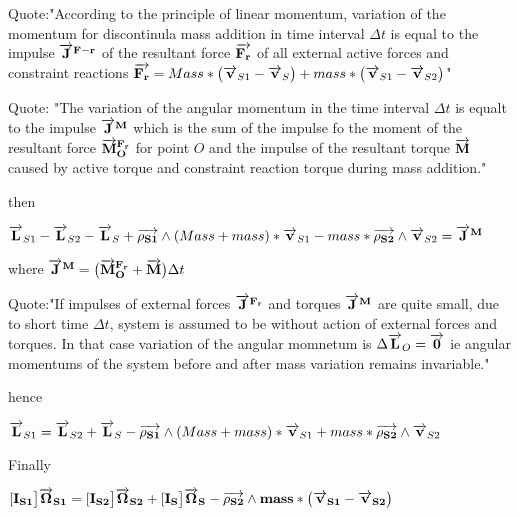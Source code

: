 Quote:"According to the principle of linear momentum, variation of the momentum for discontinula mass addition in time interval $\Delta t$ is equal to the impulse $\overrightarrow{\bf J}^{\bf F-r}$ of the resultant force $\overrightarrow{\bf F_r}$ of all external active forces and constraint reactions $\overrightarrow{\bf F_r}=Mass*\big(\overrightarrow{\bf v}_{S1}-\overrightarrow{\bf v}_{S}\big)+mass*\big(\overrightarrow{\bf v}_{S1}-\overrightarrow{\bf v}_{S2}\big)$"


Quote: "The variation of the angular momentum in the time interval $\Delta t$ is equalt to the impulse $\overrightarrow{\bf J}^{\bf M}$ which is the sum of the impulse fo the moment of the resultant force $\overrightarrow{\bf M}_{\bf O}^{\bf F_r}$ for point $O$ and the impulse of the resultant torque $\overrightarrow{\bf M}$ caused by active torque and constraint reaction torque during mass addition."

then

$\overrightarrow{\bf L}_{S1}-\overrightarrow{\bf L}_{S2}-\overrightarrow{\bf L}_{S}+\overrightarrow{\bf \rho_{S1}}\wedge (Mass+mass)*\overrightarrow{\bf v}_{S1}-mass*\overrightarrow{\bf \rho_{S2}}\wedge\overrightarrow{\bf v}_{S2}=\overrightarrow{\bf J}^{\bf M}$

where $\overrightarrow{\bf J}^{\bf M}=\big(\overrightarrow{\bf M}_{\bf O}^{\bf F_r}+\overrightarrow{\bf M}\big) \Delta t$

Quote:"If impulses of external forces $\overrightarrow{\bf J}^{\bf F_r}$ and torques $\overrightarrow{\bf J}^{\bf M}$ are quite small, due to short time $\Delta t$, system is assumed to be without action of external forces and torques. In that case variation of the angular momnetum is $\Delta \overrightarrow{\bf L}_{O}=\overrightarrow{\bf 0}$ ie angular momentums of the system before and after mass variation remains invariable."

hence

$\overrightarrow{\bf L}_{S1}=\overrightarrow{\bf L}_{S2}+\overrightarrow{\bf L}_{S}-\overrightarrow{\bf \rho_{S1}}\wedge (Mass+mass)*\overrightarrow{\bf v}_{S1}+mass*\overrightarrow{\bf \rho_{S2}}\wedge\overrightarrow{\bf v}_{S2}$

Finally

$[\bf I_{S1}\big]\overrightarrow{\bf \Omega}_{S1}=[\bf I_{S2}\big]\overrightarrow{\bf \Omega}_{S2}+[\bf I_{S}\big]\overrightarrow{\bf \Omega}_{S}-\overrightarrow{\bf \rho_{S2}}\wedge mass*\big(\overrightarrow{\bf v}_{S1}-\overrightarrow{\bf v}_{S2} \big)$

